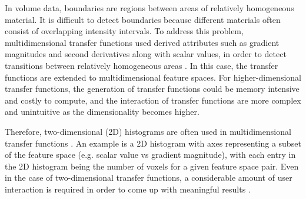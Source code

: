 In volume data, boundaries are regions between areas of relatively homogeneous material. It is difficult to detect boundaries because different materials often consist of overlapping intensity intervals. To address this problem, multidimensional transfer functions used derived attributes such as gradient magnitudes and second derivatives along with scalar values, in order to detect transitions between relatively homogeneous areas \cite{kindlmann_semi-automatic_1998} \cite{kindlmann_transfer_2002}.
In this case, the transfer functions are extended to multidimensional feature spaces.
For higher-dimensional transfer functions, the generation of transfer functions could be memory intensive and costly to compute, and the interaction of transfer functions are more complex and unintuitive as the dimensionality becomes higher. 

Therefore, two-dimensional (2D) histograms are often used in multidimensional transfer functions \cite{maciejewski_structuring_2009}. An example is a 2D histogram with axes representing a subset of the feature space (e.g. scalar value vs gradient magnitude), with each entry in the 2D histogram being the number of voxels for a given feature space pair.
Even in the case of two-dimensional transfer functions, a considerable amount of user interaction is required in order to come up with meaningful results \cite{arens_survey_2010}.

